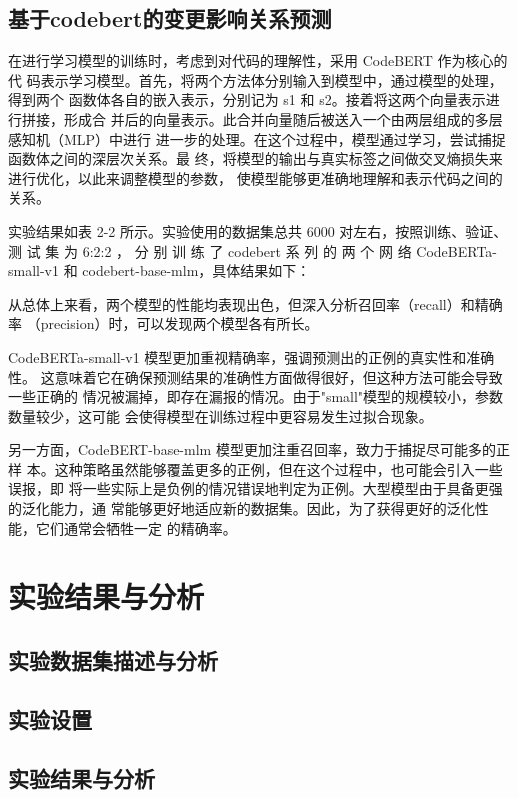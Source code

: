 \subsection{基于codebert的变更影响关系预测}

在进行学习模型的训练时，考虑到对代码的理解性，采用 CodeBERT 作为核心的代
码表示学习模型。首先，将两个方法体分别输入到模型中，通过模型的处理，得到两个
函数体各自的嵌入表示，分别记为 s1 和 s2。接着将这两个向量表示进行拼接，形成合
并后的向量表示。此合并向量随后被送入一个由两层组成的多层感知机（MLP）中进行
进一步的处理。在这个过程中，模型通过学习，尝试捕捉函数体之间的深层次关系。最
终，将模型的输出与真实标签之间做交叉熵损失来进行优化，以此来调整模型的参数，
使模型能够更准确地理解和表示代码之间的关系。

实验结果如表 2-2 所示。实验使用的数据集总共 6000 对左右，按照训练、验证、测
试 集 为 6:2:2 ， 分 别 训 练 了 codebert 系 列 的 两 个 网 络 CodeBERTa-small-v1 和
codebert-base-mlm，具体结果如下：

从总体上来看，两个模型的性能均表现出色，但深入分析召回率（recall）和精确率
（precision）时，可以发现两个模型各有所长。

CodeBERTa-small-v1 模型更加重视精确率，强调预测出的正例的真实性和准确性。
这意味着它在确保预测结果的准确性方面做得很好，但这种方法可能会导致一些正确的
情况被漏掉，即存在漏报的情况。由于"small"模型的规模较小，参数数量较少，这可能
会使得模型在训练过程中更容易发生过拟合现象。

另一方面，CodeBERT-base-mlm 模型更加注重召回率，致力于捕捉尽可能多的正样
本。这种策略虽然能够覆盖更多的正例，但在这个过程中，也可能会引入一些误报，即
将一些实际上是负例的情况错误地判定为正例。大型模型由于具备更强的泛化能力，通
常能够更好地适应新的数据集。因此，为了获得更好的泛化性能，它们通常会牺牲一定
的精确率。

\section{实验结果与分析}

\subsection{实验数据集描述与分析}
\subsection{实验设置}
\subsection{实验结果与分析}

